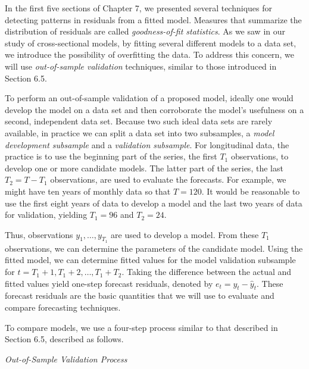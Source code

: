 In the first five sections of Chapter 7, we presented several techniques for
detecting patterns in residuals from a fitted model. Measures that summarize
the distribution of residuals are called \emph{goodness-of-fit statistics}.
As we saw in our study of cross-sectional models, by fitting several
different models to a data set, we introduce the possibility of overfitting
the data. To address this concern, we will use \emph{out-of-sample validation%
} techniques, similar to those introduced in Section 6.5.

To perform an out-of-sample validation of a proposed model, ideally
one would develop the model on a data set and then corroborate the
model's usefulness on a second, independent data set. Because two
such ideal data sets are rarely available, in practice we can split
a data set into two subsamples, a \emph{model development subsample}
and a \emph{validation subsample}. For longitudinal data, the
practice is to use the beginning part of the series, the first $T_1$
observations, to develop one or more candidate models. The latter
part of the series, the last $T_2=T-T_1$ observations, are used to
evaluate the forecasts. For example, we might have ten years of
monthly data so that $T=120$. It would be reasonable to use the
first eight years of data to develop a model and the last two years
of data for validation, yielding $T_1=96$ and $T_2=24$.

Thus, observations $y_1,\ldots , y_{T_1}$ are used to develop a
model. From these $T_1$ observations, we can determine the
parameters of the candidate model. Using the fitted model, we can
determine fitted values for the model validation subsample for $t =
T_1 + 1,T_1+2, \ldots, T_1+T_2$. Taking the difference between the
actual and fitted values yield one-step forecast residuals, denoted
by $e_t=y_t-\widehat{y}_t$. These forecast residuals are the basic
quantities that we will use to evaluate and compare forecasting
techniques.

To compare models, we use a four-step process similar to that described in
Section 6.5, described as follows.

\boxedjed

\textit{Out-of-Sample Validation Process}

